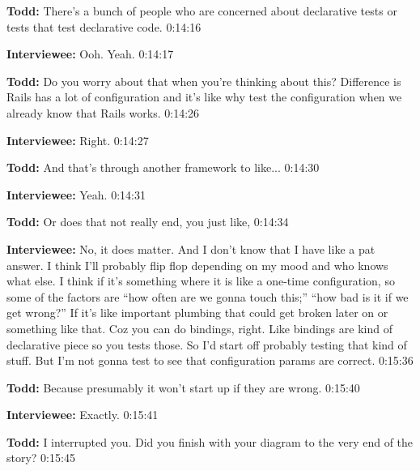 \textbf{Todd:}  	There's a bunch of people who are concerned about declarative tests or tests that test declarative code.  0:14:16

\textbf{Interviewee:}  	Ooh. Yeah. 0:14:17

\textbf{Todd:}  	Do you worry about that when you're thinking about this?  Difference is Rails has a lot of configuration and it's like why test the configuration when we already know that Rails works.  0:14:26

\textbf{Interviewee:}  	Right.  0:14:27

\textbf{Todd:}  	And that's through another framework to like... 0:14:30

\textbf{Interviewee:}  	Yeah.   0:14:31

\textbf{Todd:}  	Or does that not really end, you just like,   0:14:34

\textbf{Interviewee:}	 No, it does matter.  And I don't know that I have like a pat answer.  I think I'll probably flip flop depending on my mood and who knows what else.  I think if it's something where it is like a one-time configuration, so some of the factors are “how often are we gonna touch this;”  “how bad is it if we get wrong?” If it's like important plumbing that could get broken later on or something like that.  Coz you can do bindings, right.  Like bindings are kind of declarative piece so you tests those.  So I'd start off probably testing that kind of stuff.  But I'm not gonna test to see that configuration params are correct.  0:15:36

\textbf{Todd:}  	Because presumably it won't start up if they are wrong.   0:15:40

\textbf{Interviewee:}  	Exactly.  0:15:41

\textbf{Todd:}  	I interrupted you.  Did you finish with your diagram to the very end of the story?  0:15:45

